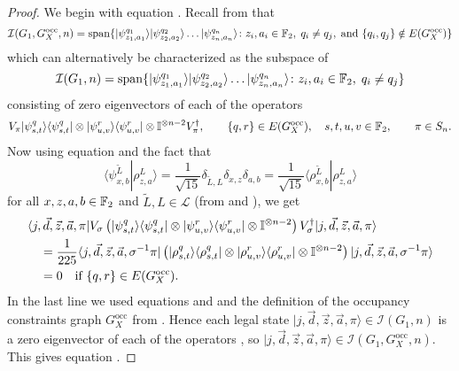 \documentclass[../thesis-main/thesis-main]{subfiles}
\begin{document}
\begin{proof}
We begin with equation . Recall from  that
\begin{equation}
  \mathcal{I}(G_{1},G_X^{\text{occ}},n)=\operatorname{span}\{ |\psi_{z_{1},a_{1}}^{q_{1}}\rangle|\psi_{z_{2},a_{2}}^{q_{2}}\rangle\ldots|\psi_{z_{n},a_{n}}^{q_{n}}\rangle\colon z_{i},a_{i}\in\mathbb{F}_2,\; q_{i}\neq q_{j},\;\text{and }\{q_{i},q_{j}\}\notin E(G_X^{\text{occ}})\} 
\end{equation}
which can alternatively be characterized as the subspace of 
\begin{equation}
\mathcal{I}(G_{1},n)=\operatorname{span}\{|\psi_{z_{1},a_{1}}^{q_{1}}\rangle|\psi_{z_{2},a_{2}}^{q_{2}}\rangle\ldots|\psi_{z_{n},a_{n}}^{q_{n}}\rangle\colon z_{i},a_{i}\in\mathbb{F}_2,\; q_{i}\neq q_{j}\} 
\end{equation}
consisting of zero eigenvectors of each of the operators 
\begin{equation}
  V_{\pi} |\psi_{s,t}^{q}\rangle\langle\psi_{s,t}^{q}|\otimes|\psi_{u,v}^{r}\rangle\langle\psi_{u,v}^{r}|\otimes\mathbb{I}^{\otimes n-2} V_{\pi}^\dag ,\qquad\{q,r\}\in E(G_X^{\text{occ}}),\quad s,t,u,v\in\mathbb{F}_2, \qquad \pi \in S_n.\label{eq:annihilate_ops}
\end{equation}
Now using equation  and the fact that 
\begin{equation}
  \langle\psi_{x,b}^{\tilde{L}}|\rho_{z,a}^{L}\rangle
  =\frac{1}{\sqrt{15}}\delta_{\tilde{L},L}\delta_{x,z}\delta_{a,b}
  =\frac{1}{\sqrt{15}}\langle\rho_{x,b}^{\tilde{L}}|\rho_{z,a}^{L}\rangle
\label{eq:psi_rho_eqn}
\end{equation}
for all $x,z,a,b\in\mathbb{F}_2$ and $\tilde{L},L\in\mathcal{L}$ (from  and ), we get
\begin{align}
&\langle j,\vec{d},\vec{z},\vec{a},\pi|V_{\sigma}\left(|\psi_{s,t}^{q}\rangle\langle\psi_{s,t}^{q}|\otimes|\psi_{u,v}^{r}\rangle\langle\psi_{u,v}^{r}|\otimes\mathbb{I}^{\otimes n-2}\right)V_{\sigma}^\dag|j,\vec{d},\vec{z},\vec{a},\pi\rangle\\
&\quad=\frac{1}{225}\langle j,\vec{d},\vec{z},\vec{a},\sigma^{-1}\pi|\left(|\rho_{s,t}^{q}\rangle\langle\rho_{s,t}^{q}|\otimes|\rho_{u,v}^{r}\rangle\langle\rho_{u,v}^{r}|\otimes\mathbb{I}^{\otimes n-2}\right)|j,\vec{d},\vec{z},\vec{a},\sigma^{-1}\pi\rangle\\
&\quad=0\quad\text{if $\{q,r\}\in E(G_X^{\text{occ}})$}.
\end{align}
In the last line we used equations  and  and the definition of the occupancy constraints graph $G_X^{\text{occ}}$ from . Hence each legal state $|j,\vec{d},\vec{z},\vec{a},\pi\rangle\in\mathcal{I}(G_{1},n)$ is a zero eigenvector of each of the operators , so $|j,\vec{d},\vec{z},\vec{a},\pi\rangle\in\mathcal{I}(G_{1},G_X^{\text{occ}},n)$. This gives equation .


\end{proof}
\end{document}
